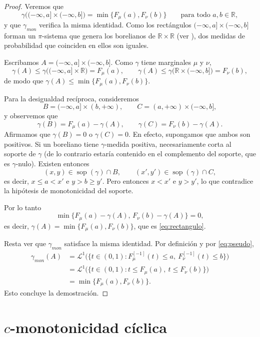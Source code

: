 \documentclass[12pt, a4paper]{amsbook}
\def\sop{\operatorname {\mathrm{sop}}}
\newcommand{\R}{{\mathbb R}}
\theoremstyle{remark}
\theoremstyle{definition}
\numberwithin{section}{chapter}
\numberwithin{subsection}{section}
\numberwithin{equation}{section}
\numberwithin{figure}{chapter}
\begin{document}
 
\begin{proof}
Veremos que
\begin{equation}\label{eq:rectangulo}
\gamma\bigl((-\infty,a]\times(-\infty,b]\bigr)=\min\{F_\mu(a),F_\nu(b)\}
\qquad\text{para todo }a,b\in\R,
\end{equation}
y que $\gamma_{mon}$ verifica la misma identidad. Como los rectángulos
$(-\infty,a]\times(-\infty,b]$ forman un $\pi$-sistema que genera los borelianos de
$\R\times\R$ (ver \cite{Billingsley}), dos medidas de probabilidad que coinciden en ellos son iguales.

Escribamos $A=(-\infty,a]\times(-\infty,b]$. Como $\gamma$ tiene marginales $\mu$ y
$\nu$,
\[
\gamma(A)\le\gamma\bigl((-\infty,a]\times\R\bigr)=F_\mu(a),
\qquad
\gamma(A)\le\gamma\bigl(\R\times(-\infty,b]\bigr)=F_\nu(b),
\]
de modo que $\gamma(A)\le\min\{F_\mu(a),F_\nu(b)\}$.

Para la desigualdad recíproca, consideremos
\[
B=(-\infty,a]\times(b,+\infty),
\qquad
C=(a,+\infty)\times(-\infty,b],
\]
y observemos que
\[
\gamma(B)=F_\mu(a)-\gamma(A),
\qquad
\gamma(C)=F_\nu(b)-\gamma(A).
\]
Afirmamos que $\gamma(B)=0$ o $\gamma(C)=0$. En efecto, supongamos que ambos son
positivos. Si un boreliano tiene $\gamma$-medida positiva, necesariamente corta al
soporte de $\gamma$ (de lo contrario estaría contenido en el complemento del soporte,
que es $\gamma$-nulo). Existen entonces
\[
(x,y)\in\sop(\gamma)\cap B,
\qquad
(x',y')\in\sop(\gamma)\cap C,
\]
es decir, $x\le a<x'$ e $y>b\ge y'$. Pero entonces $x<x'$ e $y>y'$, lo que contradice
la hipótesis de monotonicidad del soporte.

Por lo tanto
\[
\min\{F_\mu(a)-\gamma(A),\,F_\nu(b)-\gamma(A)\}=0,
\]
es decir, $\gamma(A)=\min\{F_\mu(a),F_\nu(b)\}$, que es
\eqref{eq:rectangulo}.

Resta ver que $\gamma_{mon}$ satisface la misma identidad. Por definición y
por \eqref{eq:pseudo},
\[
\begin{aligned}
\gamma_{mon}(A)
&=\mathcal L^1\bigl(\{t\in(0,1): F_\mu^{[-1]}(t)\le a,\ F_\nu^{[-1]}(t)\le b\}\bigr)\\
&=\mathcal L^1\bigl(\{t\in(0,1): t\le F_\mu(a),\ t\le F_\nu(b)\}\bigr)\\
&=\min\{F_\mu(a),F_\nu(b)\}.
\end{aligned}
\]
Esto concluye la demostración.
\end{proof}

\section{\texorpdfstring{$c$}{c}-monotonicidad cíclica}
\end{document}
